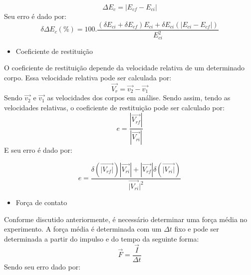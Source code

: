 \documentclass[12pt, twoside]{article}
\begin{document}
        \begin{equation}
            \label{Materiais_percentual2_energia_cinetica}
            \Delta{E_c} = |E_{cf} - E_{ci}|
        \end{equation}
Seu erro é dado por:
\begin{equation}
        \label{Materiais_erro_percentual1_energia_cinetica}
            \delta\Delta{E_c}(\%) = 100 . \frac{(\delta E_{ci} + \delta E_{cf})E_{ci} + \delta E_{ci}(|E_{ci} - E_{cf}|)}{E_{ci}^2}
        \end{equation}


        \begin{itemize}
        \item Coeficiente de restituição
        \end{itemize}
O coeficiente de restituição depende da velocidade relativa de um determinado corpo. Essa velocidade relativa pode ser calculada por:
        \begin{equation}
        \label{Materiais_velocidade_relativa}
            \vec{V_r} = \vec{v_2}-\vec{v_1}
        \end{equation}
Sendo $\vec{v_2}$ e $\vec{v_1}$ as velocidades dos corpos em análise.
Sendo assim, tendo as velocidades relativas, o coeficiente de restituição pode ser calculado por:
        \begin{equation}
        \label{Materiais_coeficiente_de_restituicao}
            e = \frac{|\vec{V_{rf}}|}{|\vec{V_{ri}}|}
        \end{equation}
E seu erro é dado por:

        \begin{equation}
        \label{Materiais_erro_coeficiente_de_restituicao}
            e = \frac{\delta (\vec{|V_{rf}|})|\vec{V_{ri}}| + |\vec{V_{rf}}| \delta (\vec{|V_{ri}|})}{\vec{|V_{ri}}|^2}
        \end{equation}

        \begin{itemize}
        \item Força de contato
        \end{itemize}

Conforme discutido anteriormente, é necessário determinar uma força média no experimento. A força média é determinada com um $\Delta t$ fixo e pode ser determinada a partir do impulso e do tempo da seguinte forma:
        \begin{equation}
        \label{Materiais_forca_de_Contato}
            \vec{F} = \frac{\vec{I}}{\Delta t}
        \end{equation}
Sendo seu erro dado por:
\end{document}
